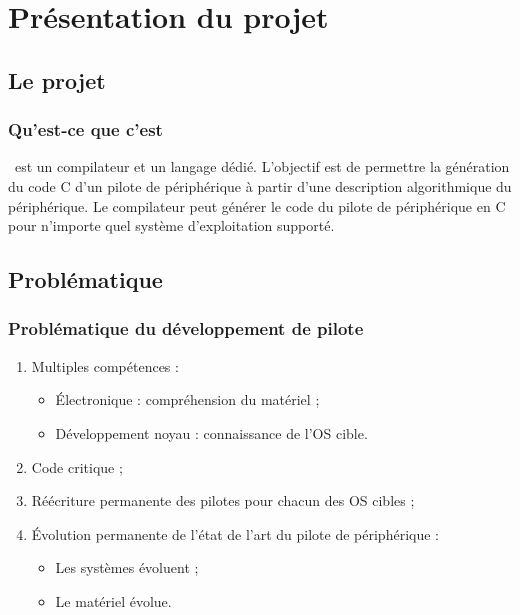 \documentclass[]{beamer}
\title{\rtx}
\subtitle{Un DSL et son compilateur}
\author{David Pineau \\ \texttt{<david@lse.epitech.eu>}}
\begin{document}
\begin{frame}
\titlepage
\end{frame}



\section{Présentation du projet}

\subsection{Le projet}
\begin{frame}
\frametitle{Qu'est-ce que c'est}
\rtx\ est un compilateur et un langage dédié. L'objectif est de permettre la
génération du code C d'un pilote de périphérique à partir d'une description
algorithmique du périphérique. Le compilateur peut générer le code du pilote de
périphérique en C pour n'importe quel système d'exploitation supporté.
\end{frame}

\subsection{Problématique}
\begin{frame}
\frametitle{Problématique du développement de pilote}
\begin{enumerate}[<+->]
    \item Multiples compétences :
        \begin{itemize}[<1->]
            \item Électronique : compréhension du matériel ;
            \item Développement noyau : connaissance de l'OS cible.
        \end{itemize}
    \item Code critique ;
    \item Réécriture permanente des pilotes pour chacun des OS cibles ;
    \item Évolution permanente de l'état de l'art du pilote de périphérique :
        \begin{itemize}
            \item Les systèmes évoluent ;
            \item Le matériel évolue.
        \end{itemize}
\end{enumerate}
\end{frame}
\end{document}
